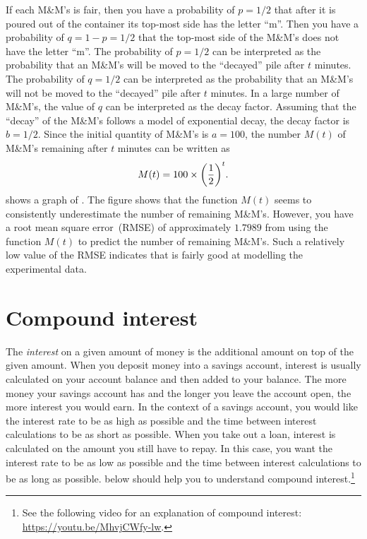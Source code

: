 \documentclass[a4paper,oneside,12pt]{article}
\begin{document}
{\begin{solution}
If each M\&M's is fair, then you have a probability of $p = 1 / 2$
that after it is poured out of the container its top-most side has the
letter ``m''.  Then you have a probability of $q = 1 - p = 1 / 2$ that
the top-most side of the M\&M's does not have the letter ``m''.  The
probability of $p = 1 / 2$ can be interpreted as the probability that
an M\&M's will be moved to the ``decayed'' pile after $t$ minutes.
The probability of $q = 1 / 2$ can be interpreted as the probability
that an M\&M's will not be moved to the ``decayed'' pile after $t$
minutes.  In a large number of M\&M's, the value of $q$ can be
interpreted as the decay factor.  Assuming that the ``decay'' of the
M\&M's follows a model of exponential decay, the decay factor is
$b = 1 / 2$.  Since the initial quantity of M\&M's is $a = 100$, the
number $M(t)$ of M\&M's remaining after $t$ minutes can be written as
\begin{equation}
\label{eqn:exponential:MnM_probability_model}
M(t)
=
100
\times
\parenthesis*{
  \frac{1}{2}
}^t.
\end{equation}
 shows a graph of
.  The figure shows
that the function $M(t)$ seems to consistently underestimate the
number of remaining M\&M's.  However, you have a root mean square
error~(RMSE) of approximately $1.7989$ from using the function $M(t)$
to predict the number of remaining M\&M's.  Such a relatively low
value of the RMSE indicates that
 is fairly good at
modelling the experimental data.
\end{solution}
}{}



\section{Compound interest}

The \emph{interest} on a given amount of money is the additional
amount on top of the given amount.  When you deposit money into a
savings account, interest is usually calculated on your account
balance and then added to your balance.  The more money your savings
account has and the longer you leave the account open, the more
interest you would earn.  In the context of a savings account, you
would like the interest rate to be as high as possible and the time
between interest calculations to be as short as possible.  When you
take out a loan, interest is calculated on the amount you still have
to repay.  In this case, you want the interest rate to be as low as
possible and the time between interest calculations to be as long as
possible.   below should help
you to understand compound interest.\footnote{
  See the following video for an explanation of compound interest:
  \url{https://youtu.be/MhvjCWfy-lw}.
}
\end{document}
